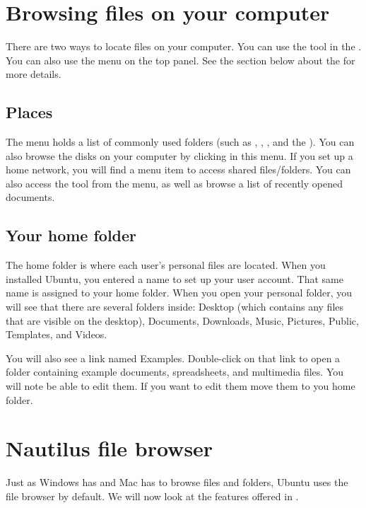 \section{Browsing files on your computer}
There are two ways to locate files on your computer.  You can use the 
tool in the  . You can also use the  menu on the top panel. See the section below about the  for more details.

\subsection{Places}
The  menu holds a list of commonly used folders (such as , , , and the ). You can also browse the disks on your computer by clicking  in this menu. If you set up a home network, you will find a menu item to access shared
files/folders. You can also access the  tool from the  menu, as well as browse a list of recently opened documents.

\subsection{Your home folder}
The home folder is where each user's personal files are located. When you installed Ubuntu, you
entered a name to set up your user account. That same name is assigned to your home folder. When you open your personal folder, you will see that there are several folders inside: Desktop (which contains any files that are visible on the desktop), Documents, Downloads, Music, Pictures, Public, Templates, and Videos.

You will also see a link named Examples. Double-click on that link to open a folder containing example documents, spreadsheets, and multimedia files. You will note be able to edit them. If you want to edit them move them to you home folder.

\section{Nautilus file browser}
\label{sec:nautilus}
Just as Windows has  and Mac  has  to browse files and folders, Ubuntu uses the  file
browser by default.  We will now look at the features offered in .

